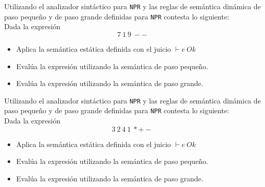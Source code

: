     \begin{exercise}
 	 Utilizando el analizador sintáctico para \texttt{NPR} y las reglas de semántica dinámica de paso pequeño y de paso grande definidas para \texttt{NPR} contesta lo siguiente: \\

        Dada la expresión $$ 7\ 1\ 9 \ - -\ $$ 
	\begin{itemize}
		\item Aplica la semántica estática definida con el juicio $\vdash e\ Ok$
        		\item Evalúa la expresión utilizando la semántica de paso pequeño.
        		\item Evalúa la expresión utilizando la semántica de paso grande.
	\end{itemize}
    \end{exercise}

    \begin{exercise}
        Utilizando el analizador sintáctico para \texttt{NPR} y las reglas de semántica dinámica de paso pequeño y de paso grande definidas para \texttt{NPR} contesta lo siguiente: \\

        Dada la expresión $$3\ 2\ 4\ 1 \ * + -\ $$ 
	\begin{itemize}
		\item Aplica la semántica estática definida con el juicio $\vdash e\ Ok$
        		\item Evalúa la expresión utilizando la semántica de paso pequeño.
        		\item Evalúa la expresión utilizando la semántica de paso grande.
	\end{itemize}
    \end{exercise}



